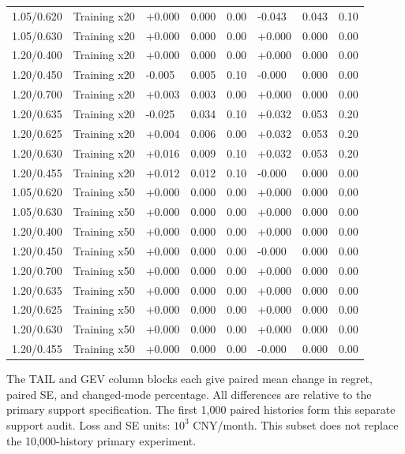 \begin{longtable}{@{}llllllll@{}}
1.05/0.620 & Training x20 & +0.000 & 0.000 & 0.00 & -0.043 & 0.043 & 0.10\\
1.05/0.630 & Training x20 & +0.000 & 0.000 & 0.00 & +0.000 & 0.000 & 0.00\\
1.20/0.400 & Training x20 & +0.000 & 0.000 & 0.00 & +0.000 & 0.000 & 0.00\\
1.20/0.450 & Training x20 & -0.005 & 0.005 & 0.10 & -0.000 & 0.000 & 0.00\\
1.20/0.700 & Training x20 & +0.003 & 0.003 & 0.00 & +0.000 & 0.000 & 0.00\\
1.20/0.635 & Training x20 & -0.025 & 0.034 & 0.10 & +0.032 & 0.053 & 0.20\\
1.20/0.625 & Training x20 & +0.004 & 0.006 & 0.00 & +0.032 & 0.053 & 0.20\\
1.20/0.630 & Training x20 & +0.016 & 0.009 & 0.10 & +0.032 & 0.053 & 0.20\\
1.20/0.455 & Training x20 & +0.012 & 0.012 & 0.10 & -0.000 & 0.000 & 0.00\\
1.05/0.620 & Training x50 & +0.000 & 0.000 & 0.00 & +0.000 & 0.000 & 0.00\\
1.05/0.630 & Training x50 & +0.000 & 0.000 & 0.00 & +0.000 & 0.000 & 0.00\\
1.20/0.400 & Training x50 & +0.000 & 0.000 & 0.00 & +0.000 & 0.000 & 0.00\\
1.20/0.450 & Training x50 & +0.000 & 0.000 & 0.00 & -0.000 & 0.000 & 0.00\\
1.20/0.700 & Training x50 & +0.000 & 0.000 & 0.00 & +0.000 & 0.000 & 0.00\\
1.20/0.635 & Training x50 & +0.000 & 0.000 & 0.00 & +0.000 & 0.000 & 0.00\\
1.20/0.625 & Training x50 & +0.000 & 0.000 & 0.00 & +0.000 & 0.000 & 0.00\\
1.20/0.630 & Training x50 & +0.000 & 0.000 & 0.00 & +0.000 & 0.000 & 0.00\\
1.20/0.455 & Training x50 & +0.000 & 0.000 & 0.00 & -0.000 & 0.000 & 0.00\\
\bottomrule
\end{longtable}
\noindent\footnotesize The TAIL and GEV column blocks each give paired mean change in regret, paired SE, and changed-mode percentage. All differences are relative to the primary support specification. The first 1,000 paired histories form this separate support audit. Loss and SE units: $10^3$ CNY/month. This subset does not replace the 10,000-history primary experiment.
\endgroup
